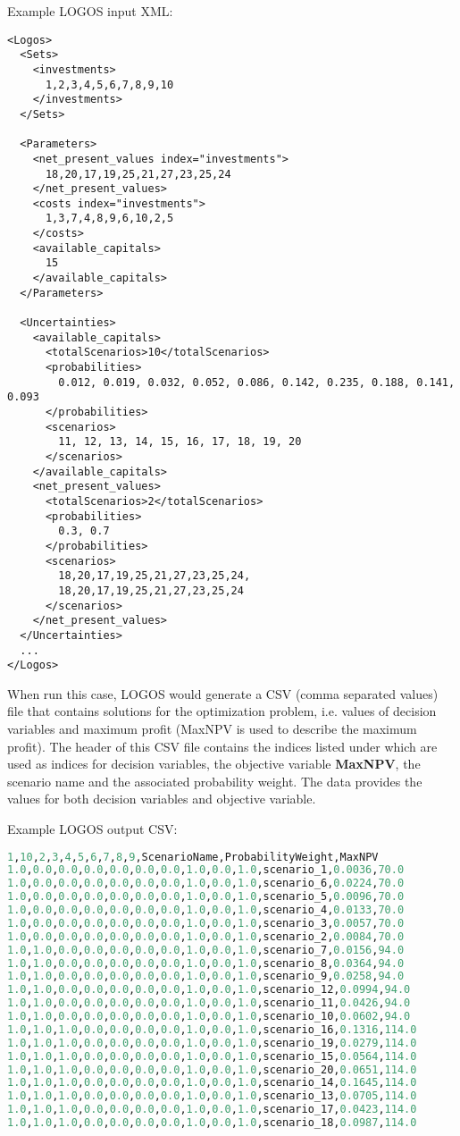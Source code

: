 Example LOGOS input XML:
\begin{lstlisting}[style=XML]
<Logos>
  <Sets>
    <investments>
      1,2,3,4,5,6,7,8,9,10
    </investments>
  </Sets>

  <Parameters>
    <net_present_values index="investments">
      18,20,17,19,25,21,27,23,25,24
    </net_present_values>
    <costs index="investments">
      1,3,7,4,8,9,6,10,2,5
    </costs>
    <available_capitals>
      15
    </available_capitals>
  </Parameters>

  <Uncertainties>
    <available_capitals>
      <totalScenarios>10</totalScenarios>
      <probabilities>
        0.012, 0.019, 0.032, 0.052, 0.086, 0.142, 0.235, 0.188, 0.141, 0.093
      </probabilities>
      <scenarios>
        11, 12, 13, 14, 15, 16, 17, 18, 19, 20
      </scenarios>
    </available_capitals>
    <net_present_values>
      <totalScenarios>2</totalScenarios>
      <probabilities>
        0.3, 0.7
      </probabilities>
      <scenarios>
        18,20,17,19,25,21,27,23,25,24,
        18,20,17,19,25,21,27,23,25,24
      </scenarios>
    </net_present_values>
  </Uncertainties>
  ...
</Logos>
\end{lstlisting}

When run this case, LOGOS would generate a CSV (comma separated values) file that
contains solutions for the optimization problem, i.e. values of decision variables
and maximum profit (MaxNPV is used to describe the maximum profit). The header of
this CSV file contains the indices listed under  which are
used as indices for decision variables, the objective variable \textbf{MaxNPV},
the scenario name and the associated probability weight.
The data provides the values for both decision variables and objective variable.

Example LOGOS output CSV:
\begin{lstlisting}[basicstyle=\small,language=python]
1,10,2,3,4,5,6,7,8,9,ScenarioName,ProbabilityWeight,MaxNPV
1.0,0.0,0.0,0.0,0.0,0.0,0.0,1.0,0.0,1.0,scenario_1,0.0036,70.0
1.0,0.0,0.0,0.0,0.0,0.0,0.0,1.0,0.0,1.0,scenario_6,0.0224,70.0
1.0,0.0,0.0,0.0,0.0,0.0,0.0,1.0,0.0,1.0,scenario_5,0.0096,70.0
1.0,0.0,0.0,0.0,0.0,0.0,0.0,1.0,0.0,1.0,scenario_4,0.0133,70.0
1.0,0.0,0.0,0.0,0.0,0.0,0.0,1.0,0.0,1.0,scenario_3,0.0057,70.0
1.0,0.0,0.0,0.0,0.0,0.0,0.0,1.0,0.0,1.0,scenario_2,0.0084,70.0
1.0,1.0,0.0,0.0,0.0,0.0,0.0,1.0,0.0,1.0,scenario_7,0.0156,94.0
1.0,1.0,0.0,0.0,0.0,0.0,0.0,1.0,0.0,1.0,scenario_8,0.0364,94.0
1.0,1.0,0.0,0.0,0.0,0.0,0.0,1.0,0.0,1.0,scenario_9,0.0258,94.0
1.0,1.0,0.0,0.0,0.0,0.0,0.0,1.0,0.0,1.0,scenario_12,0.0994,94.0
1.0,1.0,0.0,0.0,0.0,0.0,0.0,1.0,0.0,1.0,scenario_11,0.0426,94.0
1.0,1.0,0.0,0.0,0.0,0.0,0.0,1.0,0.0,1.0,scenario_10,0.0602,94.0
1.0,1.0,1.0,0.0,0.0,0.0,0.0,1.0,0.0,1.0,scenario_16,0.1316,114.0
1.0,1.0,1.0,0.0,0.0,0.0,0.0,1.0,0.0,1.0,scenario_19,0.0279,114.0
1.0,1.0,1.0,0.0,0.0,0.0,0.0,1.0,0.0,1.0,scenario_15,0.0564,114.0
1.0,1.0,1.0,0.0,0.0,0.0,0.0,1.0,0.0,1.0,scenario_20,0.0651,114.0
1.0,1.0,1.0,0.0,0.0,0.0,0.0,1.0,0.0,1.0,scenario_14,0.1645,114.0
1.0,1.0,1.0,0.0,0.0,0.0,0.0,1.0,0.0,1.0,scenario_13,0.0705,114.0
1.0,1.0,1.0,0.0,0.0,0.0,0.0,1.0,0.0,1.0,scenario_17,0.0423,114.0
1.0,1.0,1.0,0.0,0.0,0.0,0.0,1.0,0.0,1.0,scenario_18,0.0987,114.0
\end{lstlisting}

